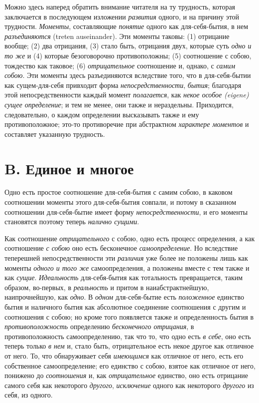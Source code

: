 Можно здесь наперед обратить внимание читателя на ту трудность, которая
заключается в последующем изложении {\em развития}
одного, и на причину этой трудности. {\em Моменты},
составляющие {\em понятие} одного как для-себя-бытия, в
нем {\em разъединяются} (treten auseinander). Эти
моменты таковы: (1) отрицание вообще; (2) два отрицания, (3) стало быть,
отрицания двух, которые суть {\em одно и то же} и (4)
которые безоговорочно противоположны; (5) соотношение с собою, тождество
как таковое; (6) {\em отрицательное} соотношение и,
однако, с {\em самим собою}. Эти моменты здесь
разъединяются вследствие того, что в для-себя-бытии как сущем-для-себя
привходит форма {\em непосредственности},
{\em бытия}; благодаря этой непосредственности каждый
момент {\em полагается}, как
{\em некое особое (eigene) сущее определение}; и тем не
менее, они также и нераздельны. Приходится, следовательно, о каждом
определении высказывать также и ему противоположное; это-то противоречие
при абстрактном {\em характере моментов} и составляет
указанную трудность.

\section*{B. Единое и многое}
Одно есть простое соотношение для-себя-бытия с самим собою, в каковом
соотношении моменты этого для-себя-бытия совпали, и потому в сказанном
соотношении для-себя-бытие имеет форму
{\em непосредственности}, и его моменты становятся
поэтому теперь {\em налично сущими}.

Как соотношение {\em отрицательного} с собою, одно есть
процесс определения, а как соотношение {\em с собою}
оно есть бесконечное {\em самоопределение}. Но
вследствие теперешней непосредственности эти
{\em различия} уже более не положены лишь как моменты
{\em одного и того же} самоопределения, а положены
вместе с тем также и как {\em сущие}.
{\em Идеальность} для-себя-бытия как тотальность
превращается, таким образом, во-первых, в
{\em реальность} и притом в наиабстрактнейшую,
наипрочнейшую, как {\em одно}. В
{\em одном} для-себя-бытие есть
{\em положенное} единство бытия и наличного бытия как
абсолютное соединение соотношения с другим и соотношения с собою; но кроме
того появляется также и определенность бытия в
{\em противоположность} определению
{\em бесконечного отрицания}, в противоположность
самоопределению, так что то, что одно есть {\em в
себе}, оно есть теперь только {\em в нем} и, стало
быть, отрицательное есть некое другое как отличное от него. То, что
обнаруживает себя {\em имеющимся} как отличное от него,
есть его собственное самоопределение; его единство с собою, взятое как
отличное от него, понижено до {\em соотношения} и, как
{\em отрицательное} единство, оно есть отрицание самого
себя как некоторого {\em другого},
{\em исключение} одного как некоторого
{\em другого} из себя, из одного.

